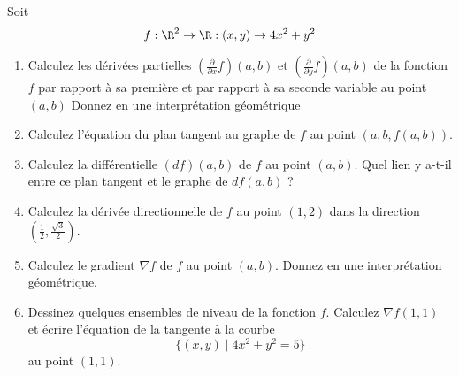 
\begin{exercice}\label{exo0058}


Soit
\[
f : \R^2 \rightarrow \R: (x,y) \rightarrow 4x^2 + y^2
\]
\begin{enumerate}
\item
Calculez les dérivées partielles $(\frac{\partial}{\partial x}f)(a,b)$
et $(\frac{\partial}{\partial y}f)(a,b)$ de la fonction $f$ par rapport
\`a sa premi\`ere et par rapport \`a sa seconde variable au point $(a,b)$
Donnez en une interprétation géométrique
\item
Calculez l'équation du plan tangent au graphe de $f$ au point
$(a,b,f(a,b))$.
\item
Calculez la différentielle $(df)(a,b)$ de $f$ au point $(a,b)$. Quel lien
y a-t-il entre ce plan tangent et le graphe de $df(a,b)$ ?
\item
Calculez la dérivée directionnelle de $f$ au point $(1,2)$ dans la
direction $(\frac{1}{2},\frac{\sqrt{3}}{2})$.
\item
Calculez le gradient $\nabla f$ de $f$ au point $(a,b)$. Donnez en une
interprétation géométrique.
\item Dessinez quelques ensembles de niveau de la fonction $f$. Calculez
$\nabla f(1,1)$ et écrire l'équation de la tangente \`a la courbe
\[
\{ (x,y) \mid 4x^2+y^2=5 \}
\]
au point $(1,1)$.
\end{enumerate}



\end{exercice}
